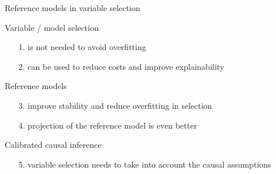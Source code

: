 \documentclass[english,t]{beamer}
\begin{document}
\begin{frame}{Reference models in variable selection}

  Variable / model selection
  \begin{itemize}
  \item[1.] is not needed to avoid overfitting
  \item[2.] can be used to reduce costs and improve explainability
  \end{itemize}

  Reference models
  \begin{itemize}
  \item[3.] improve stability and reduce overfitting in selection
  \item[4.] projection of the reference model is even better
  \end{itemize}

  Calibrated causal inference
  \begin{itemize}
  \item[5.] variable selection needs
    to take into account the causal assumptions
  \end{itemize}

\end{frame}
\end{document}
